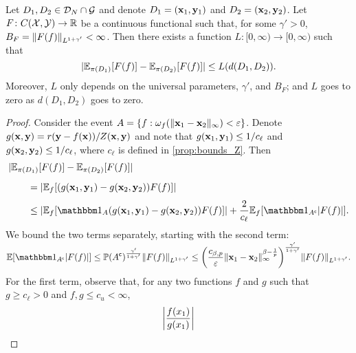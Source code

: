 \documentclass[12pt]{report}
\begin{document}
\begin{proposition} \label{prop:Lipschitzness_functional}
    Let $D_1, D_2 \in \D_N \cap \G$ and denote $D_1 = (\vx_1, \vy_1)$ and $D_2 = (\vx_2, \vy_2)$.
    Let $F\colon C(\X, \Y) \to \R$ be a continuous functional such that, for some $\gamma' > 0$, $B_F = \norm{F(f)}_{L^{1+\gamma'}} < \infty$.
    Then there exists a function $L\colon[0,\infty) \to [0, \infty)$ such that
    \begin{equation}
        \abs{\E_{\pi(D_1)}[F(f)] - \E_{\pi(D_2)}[F(f)]}
        \le L(d(D_1, D_2)).
    \end{equation}
    Moreover, $L$ only depends on the universal parameters, $\gamma'$, and $B_F$; and $L$ goes to zero as $d(D_1, D_2)$ goes to zero.
\end{proposition}
\begin{proof}
    Consider the event $A = \set{f : 
        \omega_f(\norm{\vx_1 - \vx_2}_\infty) < \e
    }$.
    Denote $g(\vx, \vy) = r(\vy - f(\vx)) / Z(\vx, \vy)$ and
    note that $g(\vx_1, \vy_1) \le 1 /c_\ell$ and $g(\vx_2, \vy_2) \le 1/c_\ell$, where $c_\ell$ is defined in \cref{prop:bounds_Z}.
    Then
    \begin{align}
        &\abs{\E_{\pi(D_1)}[F(f)] - \E_{\pi(D_2)}[F(f)]} \nonumber \\
        &\qquad = \vphantom{\frac11} \abs{\E_f\sbrac{
            \parens{
                g(\vx_1, \vy_1)
                - g(\vx_2, \vy_2)
            }
            F(f)
        }} \\
        &\qquad \le \abs{\E_f\sbrac{
            \ind_A\parens{
                g(\vx_1, \vy_1)
                - g(\vx_2, \vy_2)
            }
            F(f)
        }} + \frac2{c_\ell} \E_f[\ind_{A^\c}\abs{F(f)}].
    \end{align}
    We bound the two terms separately, starting with the second term:
    \begin{equation}
        \E[\ind_{A^\c} \abs{F(f)}]
        \le
            \P(A^\c)^{\frac{\gamma'}{1 + \gamma'}} 
            \norm{F(f)}_{L^{1 + \gamma'}}
        \le
            \parens*{
                \frac{c_{\beta, p}}{\e} \norm{\vx_1 - \vx_2}_\infty^{\beta - \frac{1}{p}}
            }^{\smash{\frac{\gamma'}{1 + \gamma'}}}
            \norm{F(f)}_{L^{1 + \gamma'}}.
    \end{equation}
    For the first term, observe that, for any two functions $f$ and $g$ such that $g \ge c_\ell > 0$ and $f, g \le c_u < \infty$,
    \begin{equation}
        \abs*{
            \frac{f(x_1)}{g(x_1)}
}
\end{equation}
\end{proof}
\end{document}
